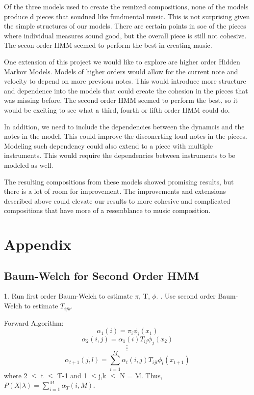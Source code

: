 \documentclass{article} %
\begin{document}
Of the three models used to create the remixed compositions, none of the models produce d pieces that soudned like fundmental music. This is not surprising given the simple structures of our models. There are certain points in soe of the pieces where individual measures sound good, but the overall piece is still not cohesive. The secon order HMM seemed to perform the best in creating music. 

One extension of this project we would like to explore are higher order Hidden Markov Models. Models of higher orders would allow for the current note and velocity to depend on more previous notes. This would introduce more structure and dependence into the models that could create the cohesion in the pieces that was missing before. The second order HMM seemed to perform the best, so it would be exciting to see what a third, fourth or fifth order HMM could do. 

In addition, we need to include the dependencies between the dynamcis and the notes in the model. This could improve the disconerting loud notes in the pieces. Modeling such dependency could also extend to a piece with multiple instruments. This would require the dependencies between instruments to be modeled as well. 

The resulting compositions from these models showed promising results, but there is a lot of room for improvement. The improvements and extensions described above could elevate our results to more cohesive and complicated compositions that have more of a resemblance to music composition. 


\newpage

\section{Appendix}

\subsection{Baum-Welch for Second Order HMM}

1. Run first order Baum-Welch to estimate $\pi$, T, $\phi$. . Use second order Baum-Welch to estimate $T_{ijk}$.\newline

Forward Algorithm: \newline
$$\alpha_1(i) = \pi_i \phi_i(x_1)$$
$$\alpha_2(i,j) = \alpha_1(i) T_{ij} \phi_j(x_2)$$
$$:$$
$$:$$
$$\alpha_{t+1}(j, l) = \sum_{i=1}^M \alpha_t(i,j) T_{ijl} \phi_l(x_{t+1})$$
where 2 $\leq$ t $\leq$ T-1 and 1 $\leq$j,k $\leq$ N = M. \newline
Thus, $P(X | \lambda) = \sum_{i=1}^M \alpha_T(i,M)$. \newline
\end{document}
